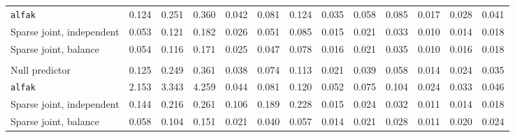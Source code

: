 \begin{center}
\begin{tabular}{l*{12}{r}}
\quad \texttt{alfak} & 0.124 & 0.251 & 0.360 & 0.042 & 0.081 & 0.124 & 0.035 & 0.058 & 0.085 & 0.017 & 0.028 & 0.041 \\
\quad Sparse joint, independent & 0.053 & 0.121 & 0.182 & 0.026 & 0.051 & 0.085 & 0.015 & 0.021 & 0.033 & 0.010 & 0.014 & 0.018 \\
\quad Sparse joint, balance & 0.054 & 0.116 & 0.171 & 0.025 & 0.047 & 0.078 & 0.016 & 0.021 & 0.035 & 0.010 & 0.016 & 0.018 \\
\addlinespace[2pt]
\multicolumn{13}{l}{\textit{3000/100, 360 d}} \\
\quad Null predictor & 0.125 & 0.249 & 0.361 & 0.038 & 0.074 & 0.113 & 0.021 & 0.039 & 0.058 & 0.014 & 0.024 & 0.035 \\
\quad \texttt{alfak} & 2.153 & 3.343 & 4.259 & 0.044 & 0.081 & 0.120 & 0.052 & 0.075 & 0.104 & 0.024 & 0.033 & 0.046 \\
\quad Sparse joint, independent & 0.144 & 0.216 & 0.261 & 0.106 & 0.189 & 0.228 & 0.015 & 0.024 & 0.032 & 0.011 & 0.014 & 0.018 \\
\quad Sparse joint, balance & 0.058 & 0.104 & 0.151 & 0.021 & 0.040 & 0.057 & 0.014 & 0.021 & 0.028 & 0.011 & 0.020 & 0.024 \\
\bottomrule
\end{tabular}
\end{center}


